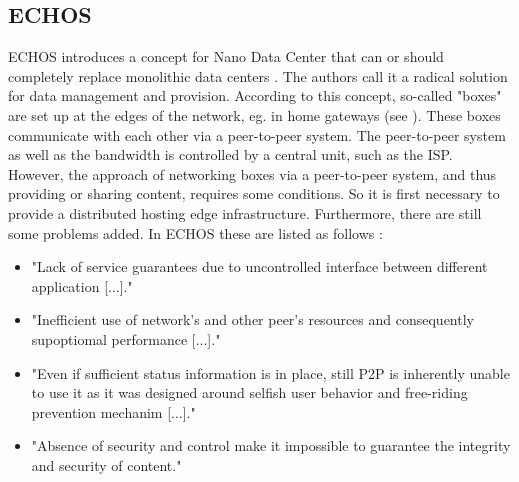 \subsection{ECHOS}
ECHOS introduces a concept for Nano Data Center that can or should completely replace monolithic data centers \cite{Laoutaris:2008:EEC:1341431.1341442}. The authors call it a radical solution for data management and provision.
According to this concept, so-called "boxes" are set up at the edges of the network, eg. in home gateways (see \cite{technicolor}). These boxes communicate with each other via a peer-to-peer system. The peer-to-peer system as well as the bandwidth is controlled by a central unit, such as the ISP. However, the approach of networking boxes via a peer-to-peer system, and thus providing or sharing content, requires some conditions. So it is first necessary to provide a distributed hosting edge infrastructure. Furthermore, there are still some problems added. In ECHOS these are listed as follows \cite{Laoutaris:2008:EEC:1341431.1341442}:
\begin{itemize}
	\item "Lack of service guarantees due to uncontrolled interface between different application [...]."
	\item "Inefficient use of network's and other peer's resources and consequently supoptiomal performance [...]."
	\item "Even if sufficient status information is in place, still P2P is inherently unable to use it as it was designed around selfish user behavior and free-riding prevention mechanim [...]."
	\item "Absence of security and control make it impossible to guarantee the integrity and security of content."
\end{itemize}